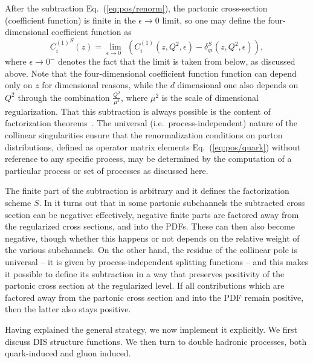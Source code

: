 After the subtraction Eq.~(\ref{eq:pos/renorm}), the partonic cross-section
(coefficient function) is
finite in the $\epsilon\to0$ limit, so one may define the
four-dimensional coefficient function as
\begin{equation}\label{eq:pos/crenorm}
    {C^{(1)}_{i}}^S(z) = \lim_{\epsilon\to0^-}\left( {C^{(1)}_{i}}(z,Q^2,\epsilon)
    -\delta_{qi}^S(z,Q^2,\epsilon)\right),
\end{equation}
where $\epsilon\to 0^-$ denotes the fact that the limit is taken from
below, as discussed above. Note that the four-dimensional coefficient
function function can depend only on $z$ for dimensional reasons,
while the $d$ dimensional one  also depends on $Q^2$ through the
combination $\frac{Q^2}{\mu^2}$, where $\mu^2$ is the scale of
dimensional regularization. That this subtraction is always possible
is the content of factorization
theorems~\cite{Collins:2011zzd,Curci:1980uw}. The universal
(i.e.\ process-independent) nature of the collinear singularities
ensure that the renormalization conditions on parton distributions,
defined as operator matrix elements Eq.~(\ref{eq:pos/quark})
without reference to any specific
process, may be determined by the computation of a particular process
or set of processes as discussed here.

The finite part of the
subtraction is arbitrary and it defines the factorization scheme $S$. In
\msbar{} it turns out that in some partonic subchannels the
subtracted cross section can be negative:
effectively, negative finite parts are factored away from the
regularized cross sections, and into the PDFs. These can then
also become negative, though whether this happens or not depends on
the relative weight of the various subchannels.
On the other hand, the residue of the collinear pole is universal -- it is
given by process-independent splitting functions -- and this makes it possible
to define its subtraction in a way that preserves positivity of the partonic
cross section at the regularized level. 
If all contributions which are factored away from the partonic cross section
and into the PDF remain positive, then the latter also stays positive.


Having explained the general strategy, we now implement it explicitly. 
We first discuss DIS structure functions.
We then turn to double hadronic processes, both quark-induced and gluon
induced.


